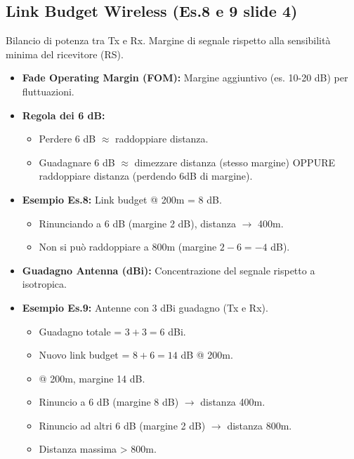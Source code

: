 \subsection{Link Budget Wireless (Es.8 e 9 slide 4)}
Bilancio di potenza tra Tx e Rx. Margine di segnale rispetto alla sensibilità minima del ricevitore (RS).
\begin{itemize}
    \item \textbf{Fade Operating Margin (FOM):} Margine aggiuntivo (es. 10-20 dB) per fluttuazioni.
    \item \textbf{Regola dei 6 dB:}
    \begin{itemize}
        \item Perdere 6 dB $\approx$ raddoppiare distanza.
        \item Guadagnare 6 dB $\approx$ dimezzare distanza (stesso margine) OPPURE raddoppiare distanza (perdendo 6dB di margine).
    \end{itemize}
    \item \textbf{Esempio Es.8:} Link budget @ 200m = 8 dB.
    \begin{itemize}
        \item Rinunciando a 6 dB (margine 2 dB), distanza $\rightarrow$ 400m.
        \item Non si può raddoppiare a 800m (margine $2 - 6 = -4$ dB).
    \end{itemize}
    \item \textbf{Guadagno Antenna (dBi):} Concentrazione del segnale rispetto a isotropica.
    \item \textbf{Esempio Es.9:} Antenne con 3 dBi guadagno (Tx e Rx).
    \begin{itemize}
        \item Guadagno totale = $3 + 3 = 6$ dBi.
        \item Nuovo link budget = $8 + 6 = 14$ dB @ 200m.
        \item @ 200m, margine 14 dB.
        \item Rinuncio a 6 dB (margine 8 dB) $\rightarrow$ distanza 400m.
        \item Rinuncio ad altri 6 dB (margine 2 dB) $\rightarrow$ distanza 800m.
        \item Distanza massima > 800m.
    \end{itemize}
\end{itemize}

